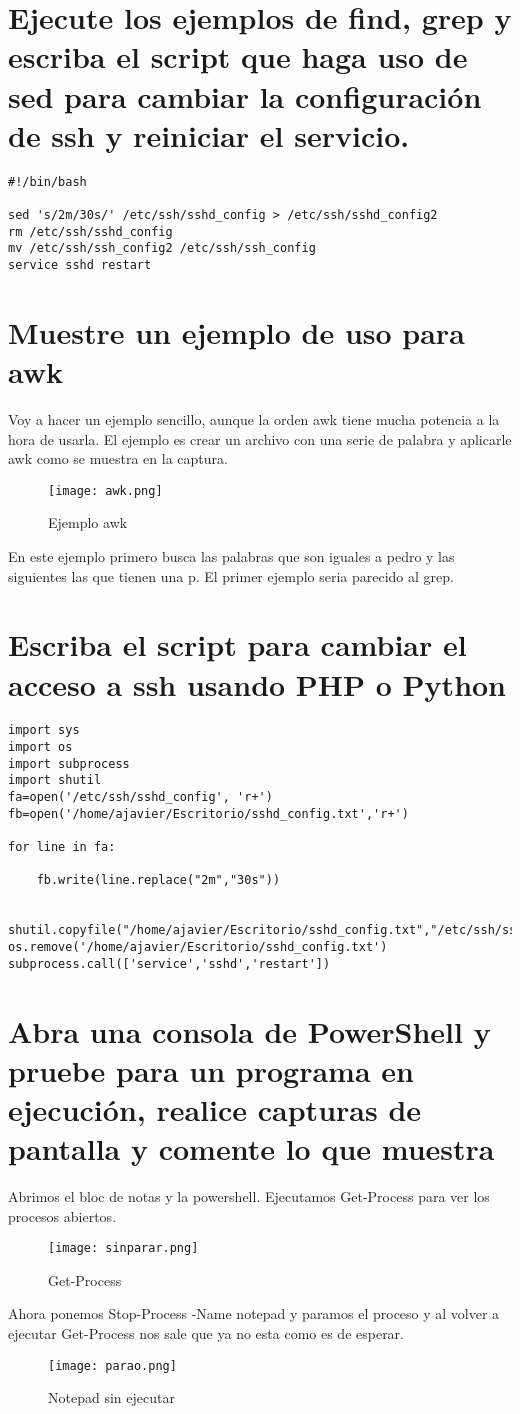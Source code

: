 \section{Ejecute los ejemplos de find, grep y escriba el script que haga uso de sed para cambiar la configuración de ssh y reiniciar el servicio.}

\begin{verbatim}
#!/bin/bash

sed 's/2m/30s/' /etc/ssh/sshd_config > /etc/ssh/sshd_config2
rm /etc/ssh/sshd_config
mv /etc/ssh/ssh_config2 /etc/ssh/ssh_config
service sshd restart
\end{verbatim}
\section{Muestre un ejemplo de uso para awk}
Voy a hacer un ejemplo sencillo, aunque la orden awk tiene mucha potencia a la hora de usarla.
El ejemplo es crear un archivo con una serie de palabra y aplicarle awk como se muestra en la captura.
\begin{figure}[H] 
\centering
\texttt{[image: awk.png]}  
\label{figura45:}
\caption{Ejemplo awk}
\end{figure}
En este ejemplo primero busca las palabras que son iguales a pedro y las siguientes las que tienen una p. El primer ejemplo seria parecido al grep.
\section{Escriba el script para cambiar el acceso a ssh usando PHP o Python}
\begin{verbatim}
import sys
import os
import subprocess
import shutil
fa=open('/etc/ssh/sshd_config', 'r+')
fb=open('/home/ajavier/Escritorio/sshd_config.txt','r+')

for line in fa:
	
	fb.write(line.replace("2m","30s"))
	

shutil.copyfile("/home/ajavier/Escritorio/sshd_config.txt","/etc/ssh/sshd_config")
os.remove('/home/ajavier/Escritorio/sshd_config.txt')	
subprocess.call(['service','sshd','restart']) 

\end{verbatim}
\section{Abra una consola de PowerShell y pruebe para un programa en ejecución, realice capturas de pantalla y comente lo que muestra}
Abrimos el bloc de notas y la powershell. Ejecutamos Get-Process para ver los procesos abiertos.
\begin{figure}[H] 
\centering
\texttt{[image: sinparar.png]}  
\label{figura46:}
\caption{Get-Process}
\end{figure}
Ahora ponemos Stop-Process -Name notepad y paramos el proceso y al volver a ejecutar Get-Process nos sale que ya no esta como es de esperar.
\begin{figure}[H] 
\centering
\texttt{[image: parao.png]}  
\label{figura47:}
\caption{Notepad sin ejecutar}
\end{figure}


